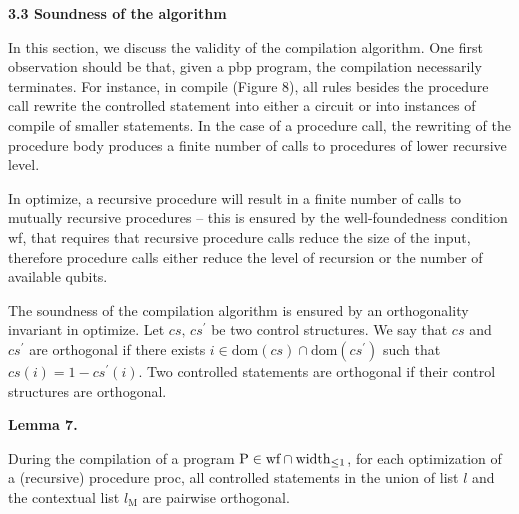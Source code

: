  
 
 
\par\medskip\noindent\textbf{3.3 Soundness of the algorithm}\par
 
 
In this section, we discuss the validity of the compilation algorithm. One first observation should be that, given a pbp program, the compilation necessarily terminates. For instance, in compile (Figure 8), all rules besides the procedure call rewrite the controlled statement into either a circuit or into instances of compile of smaller statements. In the case of a procedure call, the rewriting of the procedure body produces a finite number of calls to procedures of lower recursive level.\par
 
 
 
In optimize, a recursive procedure will result in a finite number of calls to mutually recursive procedures – this is ensured by the well-foundedness condition wf, that requires that recursive procedure calls reduce the size of the input, therefore procedure calls either reduce the level of recursion or the number of available qubits.\par
 
 
 
The soundness of the compilation algorithm is ensured by an orthogonality invariant in optimize. Let $cs,\,cs^{\prime}$ be two control structures. We say that $cs$ and $cs^{\prime}$ are orthogonal if there exists $i\in\text{dom}(cs)\cap\text{dom}(cs^{\prime})$ such that $cs(i)=1-cs^{\prime}(i)$. Two controlled statements are orthogonal if their control structures are orthogonal.\par
 
 
 
\par\medskip\noindent\textbf{Lemma 7.}\par
 
 
During the compilation of a program $\mathrm{P}\in\textnormal{{wf}}\cap\textnormal{{width}}_{\leq 1}$, for each optimization of a (recursive) procedure proc, all controlled statements in the union of list $l$ and the contextual list $l_{\text{M}}$ are pairwise orthogonal.\par
 
